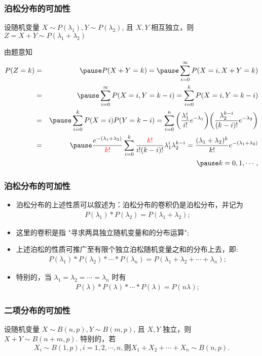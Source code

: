  \begin{frame}
 	\frametitle{泊松分布的可加性}
 	\begin{exam}[泊松分布的可加性] 设随机变量 $X\sim P (\lambda_1), Y\sim P (\lambda_2)$, 且 $X,Y$ 相互独立，则 $Z=X+Y\sim P (\lambda_1+\lambda_2)$
 	\end{exam}

 	\pause \jieda 由题意知
 	\begin{eqnarray*}
 		P(Z=k)&=&\pause P(X+Y=k)=\pause \sum_{i=0}^\infty P(X=i, X+Y=k)\\
 		&=&\pause \sum_{i=0}^\infty P(X=i, Y=k-i)=\sum_{i=0}^kP(X=i,Y=k-i)\\
 		&=&\pause \sum_{i=0}^kP(X=i)P(Y=k-i)=\sum_{i=0}^n\bigg(\dfrac{\lambda_1^i}{i!}e^{-\lambda_1}\bigg)\bigg(\dfrac{\lambda_2^{k-i}}{(k-i)!}e^{-\lambda_2}\bigg)\\
 		&=&\pause \dfrac{e^{-(\lambda_1+\lambda_2)}}{\textcolor{red}{k!}}\sum_{i=0}^k\dfrac{\textcolor{red}{k!}}{i!(k-i)!}\lambda_1^i\lambda_2^{k-i}=\dfrac{(\lambda_1+\lambda_2)^k}{k!}e^{-(\lambda_1+\lambda_2)}\\
 		&&\pause k=0,1,\cdots,
 	\end{eqnarray*}

 \end{frame}

 \begin{frame}
 	\frametitle{泊松分布的可加性}

 	\begin{itemize}[<+-|alert@+>]
 		\item 泊松分布的上述性质可以叙述为：泊松分布的卷积仍是泊松分布，并记为
 		\begin{eqnarray*}
 			P(\lambda_1)*P(\lambda_2)=P(\lambda_1+\lambda_2);
 		\end{eqnarray*}
 		\item 这里的卷积是指 "寻求两具独立随机变量和的分布运算";
 		\item 上述泊松的性质可推广至有限个独立泊松随机变量之和的分布上去，即:
 		\begin{eqnarray*}
 			P(\lambda_1)*P(\lambda_2)*\cdots *P(\lambda_n)=P(\lambda_1+\lambda_2+\cdots+\lambda_n);
 		\end{eqnarray*}
 		\item 特别的，当 $\lambda_1=\lambda_2=\cdots=\lambda_n$ 时有
 		\begin{eqnarray*}
 			P(\lambda)*P(\lambda)*\cdots *P(\lambda)=P(n\lambda);
 		\end{eqnarray*}

 	\end{itemize}
 \end{frame}
 \begin{frame}
 	\frametitle{二项分布的可加性}
 	\begin{exam}[二项分布的可加性]
 		设随机变量 $X\sim B (n,p), Y\sim B (m,p)$, 且 $X,Y$ 独立，则 $X+Y\sim B (n+m,p)$. 特别的，若 $$X_i\sim B (1,p), i=1,2,\cdots, n, \mbox{则} X_1+X_2+\cdots+X_n\sim B (n,p).$$
 	\end{exam}
 \end{frame}


